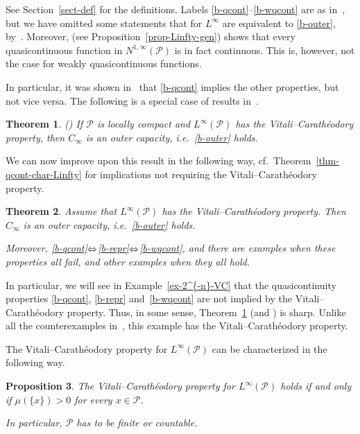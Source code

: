 \documentclass[a4paper,twoside]{article}
\theoremstyle{propositional}
\newtheorem{thm}{Theorem}[section]
\newtheorem{prop}[thm]{Proposition}
\theoremstyle{descriptive}
\newcommand{\Cinfty}{{C_\infty}}
\newcommand{\Ninfty}{N^{1,\infty}}
\renewcommand{\P}{\mathcal{P}}
\numberwithin{equation}{section}
\newcommand{\eqv}{\ensuremath{
\mathchoice{\ \Longleftrightarrow \ }{\Leftrightarrow}
                {\Leftrightarrow}{\Leftrightarrow}}}
\begin{document}
See Section~\ref{sect-def} for the definitions.
Labels \ref{b-qcont}--\ref{b-wqcont} are as in~\cite{BBLMaly},
but we have omitted some statements 
that for $L^\infty$ 
are equivalent to \ref{b-outer}, by~\cite[Theorem~1.4]{BBLMaly}.
Moreover, \cite[Proposition~6.1]{BBLMaly}
(see Proposition~\ref{prop-Linfty-gen}) shows that
every quasicontinuous function in $\Ninfty(\P)$
is in fact continuous.
This is, however, not the case for weakly quasicontinuous functions.

In particular, it was shown in~\cite[Theorems~1.2 and~1.4]{BBLMaly} that 
\ref{b-qcont} implies the other properties, but not vice versa.
The following 
is a special case of results in~\cite{BBLMaly}.

\begin{thm} \label{thm-VC-new-intro}
\textup{(\cite[Theorems~1.4 and~1.5]{BBLMaly})}
If
$\P$ is locally compact and $L^\infty(\P)$ has the Vitali--Carath\'eodory
property, then
$\Cinfty$ is an outer capacity, i.e.\ \ref{b-outer} holds.
\end{thm}

We can now improve upon this result in the following way,
cf.\ Theorem~\ref{thm-qcont-char-Linfty} for 
implications not  requiring 
the Vitali--Carath\'eodory property.

\begin{thm} \label{thm-main}
Assume that 
$L^\infty(\P)$ has the Vitali--Carath\'eodory property.
Then 
$\Cinfty$ is an outer capacity, i.e.\ \ref{b-outer} holds.

Moreover, \ref{b-qcont}\eqv\ref{b-repr}\eqv\ref{b-wqcont},
and there are examples when these properties all fail,  and other
examples when they all hold.
\end{thm}



In particular, we will see in Example~\ref{ex-2^{-n}-VC} that
the quasicontinuity properties \ref{b-qcont}, \ref{b-repr} and~\ref{b-wqcont}
are not implied by the Vitali--Carath\'eodory property.
Thus, in some sense,
Theorem~\ref{thm-VC-new-intro} (and \cite[Theorem~1.5]{BBLMaly})
is  sharp.
Unlike all the counterexamples in~\cite{BBLMaly}, 
this example has the Vitali--Carath\'eodory property.


The Vitali--Carath\'eodory property for $L^\infty(\P)$
can be characterized in the following way.

\begin{prop}  \label{prop-VC}
The Vitali--Carath\'eodory property for $L^\infty(\P)$ holds if and only if
$\mu(\{x\})>0$ for every $x\in\P$.

In particular, $\P$ has to be finite or countable.
\end{prop}
\end{document}
